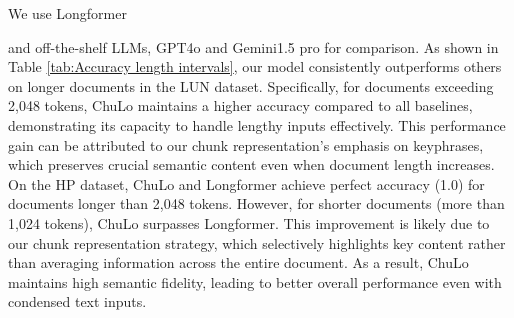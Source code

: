 \documentclass[11pt]{article}
\begin{document}
We use Longformer 


and off-the-shelf LLMs, GPT4o and Gemini1.5 pro for comparison. 
As shown in Table \ref{tab:Accuracy length intervals}, our model consistently outperforms others on longer documents in the LUN dataset. Specifically, for documents exceeding 2,048 tokens, ChuLo maintains a higher accuracy compared to all baselines, demonstrating its capacity to handle lengthy inputs effectively. This performance gain can be attributed to our chunk representation’s emphasis on keyphrases, which preserves crucial semantic content even when document length increases.
On the HP dataset, ChuLo and Longformer achieve perfect accuracy (1.0) for documents longer than 2,048 tokens. However, for shorter documents (more than 1,024 tokens), ChuLo surpasses Longformer. This improvement is likely due to our chunk representation strategy, which selectively highlights key content rather than averaging information across the entire document. As a result, ChuLo maintains high semantic fidelity, leading to better overall performance even with condensed text inputs.
\end{document}
